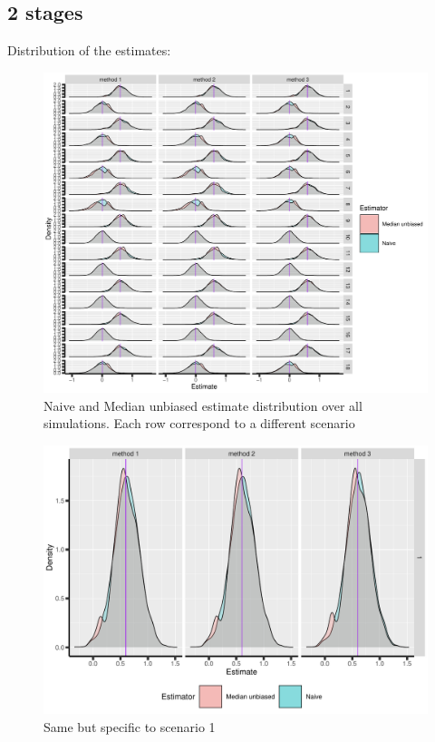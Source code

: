 \documentclass[12pt]{article}
\begin{document}
\subsection{2 stages}
\label{sec:orge60453b}
Distribution of the estimates:
\begin{figure}[!h]
\centering
\includegraphics[trim={0 0 0 0},width=1\textwidth]{./figures/gg2stage-estimate-density.pdf}
\caption{Naive and Median unbiased estimate distribution over all simulations. Each row correspond to a different scenario}
\end{figure}

\begin{figure}[!h]
\centering
\includegraphics[trim={0 0 0 0},width=\textwidth]{./figures/gg2stage-estimate-density-scenario1.pdf}
\caption{Same but specific to scenario 1}
\end{figure}
\end{document}
